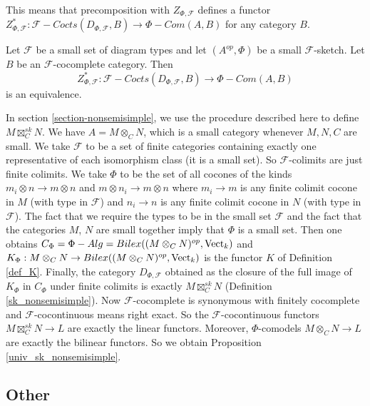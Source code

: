 This means that precomposition with $Z_{\Phi,\mathcal{F}}$ defines a functor $Z_{\Phi,\mathcal{F}}^*:\mathcal{F}-Cocts(D_{\Phi,\mathcal{F}},B)\to\Phi-Com(A,B)$ for any category $B$.

\begin{theorem}\cite[Theorem 6.23]{kelly/basic-concepts-enriched}\label{f_theory_small_sketch}
Let $\mathcal{F}$ be a small set of diagram types and let $(A^{op},\Phi)$ be a small $\mathcal{F}$-sketch. Let $B$ be an $\mathcal{F}$-cocomplete category. Then $$Z_{\Phi,\mathcal{F}}^*:\mathcal{F}-Cocts(D_{\Phi,\mathcal{F}},B)\to\Phi-Com(A,B)$$ is an equivalence.
\end{theorem}

In section \ref{section-nonsemisimple}, we use the procedure described here to define $M\boxtimes_C^{sk}N$. We have $A=M\otimes_C N$, which is a small category whenever $M,N,C$ are small. We take $\mathcal{F}$ to be a set of finite categories containing exactly one representative of each isomorphism class (it is a small set). So $\mathcal{F}$-colimits are just finite colimits. We take $\Phi$ to be the set of all cocones of the kinds $m_i\otimes n\to m\otimes n$ and $m\otimes n_i\to m\otimes n$ where $m_i\to m$ is any finite colimit cocone in $M$ (with type in $\mathcal{F}$) and $n_i\to n$ is any finite colimit cocone in $N$ (with type in $\mathcal{F}$). The fact that we require the types to be in the small set $\mathcal{F}$ and the fact that the categories $M$, $N$ are small together imply that $\Phi$ is a small set.  Then one obtains $C_{\Phi}=\Phi-Alg=Bilex((M\otimes_C N)^{op},\operatorname{Vect}_k)$ and $K_{\Phi}:M\otimes_C N\to Bilex((M\otimes_C N)^{op},\operatorname{Vect}_k)$ is the functor $K$ of Definition \ref{def_K}. Finally, the category $D_{\Phi,\mathcal{F}}$ obtained as the closure of the full image of $K_{\Phi}$ in $C_{\Phi}$ under finite colimits is exactly $M\boxtimes_C^{sk}N$ (Definition \ref{sk_nonsemisimple}). Now $\mathcal{F}$-cocomplete is synonymous with finitely cocomplete and $\mathcal{F}$-cocontinuous means right exact. So the $\mathcal{F}$-cocontinuous functors $M\boxtimes_C^{sk}N\to L$ are exactly the linear functors. Moreover, $\Phi$-comodels $M\otimes_C N\to L$ are exactly the bilinear functors. So we obtain Proposition \ref{univ_sk_nonsemisimple}.




\subsection{Other}

